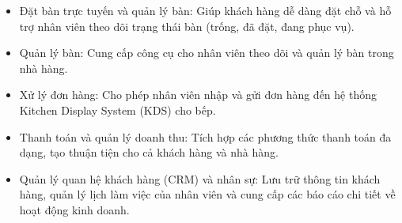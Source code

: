 \begin{itemize}


	\item Đặt bàn trực tuyến và quản lý bàn: Giúp khách hàng dễ dàng đặt chỗ và hỗ trợ nhân viên theo dõi trạng thái bàn (trống, đã đặt, đang phục vụ).

	\item Quản lý bàn: Cung cấp công cụ cho nhân viên theo dõi và quản lý bàn trong nhà hàng.

	\item Xử lý đơn hàng: Cho phép nhân viên nhập và gửi đơn hàng đến hệ thống Kitchen Display System (KDS) cho bếp.

	\item Thanh toán và quản lý doanh thu: Tích hợp các phương thức thanh toán đa dạng, tạo thuận tiện cho cả khách hàng và nhà hàng.

	\item Quản lý quan hệ khách hàng (CRM) và nhân sự: Lưu trữ thông tin khách hàng, quản lý lịch làm việc của nhân viên và cung cấp các báo cáo chi tiết về hoạt động kinh doanh.
\end{itemize}




% 





